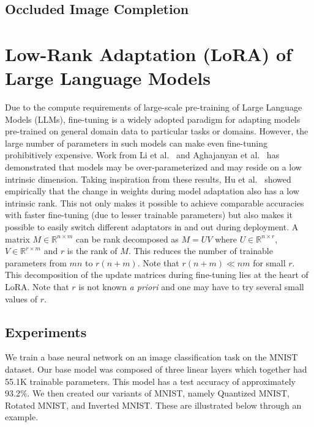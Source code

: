 \documentclass{article}
\newcommand{\R}{\mathbb{R}}
\begin{document}
\label{gen_inst}

\subsection{Occluded Image Completion}

\section{Low-Rank Adaptation (LoRA) of Large Language Models}
Due to the compute requirements of large-scale pre-training of Large Language Models (LLMs), fine-tuning is a widely adopted paradigm for adapting models pre-trained on general domain data to particular tasks or domains. However, the large number of parameters in such models can make even fine-tuning prohibitively expensive. Work from Li et al.~\cite{li2018measuring} and Aghajanyan et al.~\cite{aghajanyan2020intrinsic} has demonstrated that models may be over-parameterized and may reside on a low intrinsic dimension. Taking inspiration from these results, Hu et al.~\cite{hu2022lora} showed empirically that the change in weights during model adaptation also has a low intrinsic rank. This not only makes it possible to achieve comparable accuracies with faster fine-tuning (due to lesser trainable parameters) but also makes it possible to easily switch different adaptators in and out during deployment. A matrix $M \in \R^{n \times m}$ can be rank decomposed as $M = UV$ where $U \in \R^{n \times r}$, $V \in \R^{r \times m}$ and $r$ is the rank of $M$. This reduces the number of trainable parameters from $mn$ to $r(n + m)$. Note that $r(n + m) \ll nm$ for small $r$. This decomposition of the update matrices during fine-tuning lies at the heart of LoRA. Note that $r$ is not known \textit{a priori} and one may have to try several small values of $r$.

\subsection{Experiments}
We train a base neural network on an image classification task on the MNIST dataset. Our base model was composed of three linear layers which together had 55.1K trainable parameters. This model has a test accuracy of approximately 93.2\%. We then created our variants of MNIST, namely Quantized MNIST, Rotated MNIST, and Inverted MNIST. These are illustrated below through an example.
\end{document}
